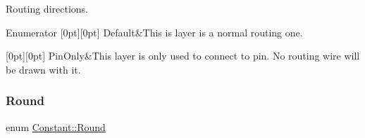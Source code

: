 Routing directions. \begin{DoxyEnumFields}{Enumerator}
[0pt][0pt]{}\mbox{\label{namespaceConstant_ab2e46a17cc373a268c5c24fa0e2067e5ac83c789478a5dfedee2496415c62c1fb}} 
Default&This is layer is a normal routing one. \\
\hline

[0pt][0pt]{}\mbox{\label{namespaceConstant_ab2e46a17cc373a268c5c24fa0e2067e5a816e7f6e3fb44de0c2da893f32a6748e}} 
Pin\+Only&This layer is only used to connect to pin. No routing wire will be drawn with it. \\
\hline

\end{DoxyEnumFields}
\mbox{\label{namespaceConstant_abb6258ce09861f20cfe37b49d9a3515f}} 
\subsubsection{\texorpdfstring{Round}{Round}}
{\footnotesize\ttfamily enum \hyperlink{namespaceConstant_abb6258ce09861f20cfe37b49d9a3515f}{Constant\+::\+Round}}

